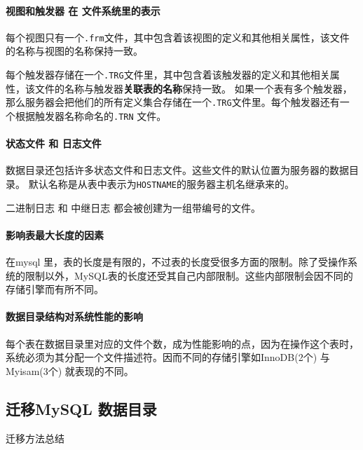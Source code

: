 \documentclass[UTF8,a4paper,12pt]{ctexbook}
\begin{document}
				
			\paragraph{视图和触发器 在 文件系统里的表示}
			
				每个视图只有一个\verb|.frm|文件，其中包含着该视图的定义和其他相关属性，该文件的名称与视图的名称保持一致。
				
				每个触发器存储在一个\verb|.TRG|文件里，其中包含着该触发器的定义和其他相关属性，该文件的名称与触发器\textbf{关联表的名称}保持一致。
				如果一个表有多个触发器，那么服务器会把他们的所有定义集合存储在一个\verb|.TRG|文件里。每个触发器还有一个根据触发器名称命名的\verb|.TRN| 文件。
			
			
			\paragraph{状态文件 和 日志文件}
				数据目录还包括许多状态文件和日志文件。这些文件的默认位置为服务器的数据目录。 默认名称是从表中表示为\verb|HOSTNAME|的服务器主机名继承来的。
				
				二进制日志 和 中继日志 都会被创建为一组带编号的文件。
			
			
			\paragraph{影响表最大长度的因素}
				在mysql 里，表的长度是有限的，不过表的长度受很多方面的限制。除了受操作系统的限制以外，MySQL表的长度还受其自己内部限制。这些内部限制会因不同的存储引擎而有所不同。
			
					
				
			\paragraph{数据目录结构对系统性能的影响}
				每个表在数据目录里对应的文件个数，成为性能影响的点，因为在操作这个表时，系统必须为其分配一个文件描述符。因而不同的存储引擎如InnoDB(2个) 与 Myisam(3个) 就表现的不同。
				
				
		
		\subsection{迁移MySQL 数据目录}
			迁移方法总结
			
\end{document}

